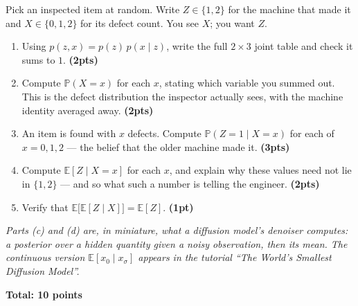 \documentclass[11pt,a4paper]{article}
\newcommand{\pts}[1]{\hfill\textbf{(#1pts)}}
\newcommand{\pt}[1]{\hfill\textbf{(#1pt)}}
\newcommand{\total}[1]{\par\medskip\noindent\textbf{Total: #1 points}}
\newcommand{\PP}{\mathbb{P}}
\newcommand{\EE}{\mathbb{E}}
\newenvironment{parts}
  {\begin{enumerate}\setlength{\itemsep}{0.45em}\setlength{\parskip}{0pt}}
  {\end{enumerate}}
\begin{document}
\noindent
Pick an inspected item at random. Write $Z \in \{1,2\}$ for the machine that made
it and $X \in \{0,1,2\}$ for its defect count. You see $X$; you want $Z$.

\begin{parts}
  \item Using $p(z,x) = p(z)\,p(x \mid z)$, write the full $2 \times 3$ joint
        table and check it sums to $1$. \pts{2}
  \item Compute $\PP(X = x)$ for each $x$, stating which variable you summed
        out. This is the defect distribution the inspector actually sees, with the
        machine identity averaged away. \pts{2}
  \item An item is found with $x$ defects. Compute $\PP(Z = 1 \mid X = x)$ for
        each of $x = 0, 1, 2$ — the belief that the older machine made it. \pts{3}
  \item Compute $\EE[Z \mid X = x]$ for each $x$, and explain why these values
        need not lie in $\{1,2\}$ — and so what such a number is telling the
        engineer. \pts{2}
  \item Verify that $\EE\big[\EE[Z \mid X]\big] = \EE[Z]$. \pt{1}
\end{parts}

\noindent\textit{Parts (c) and (d) are, in miniature, what a diffusion model's
denoiser computes: a posterior over a hidden quantity given a noisy observation,
then its mean. The continuous version $\EE[x_0 \mid x_\sigma]$ appears in the
tutorial ``The World's Smallest Diffusion Model''.}

\total{10}
\end{document}
